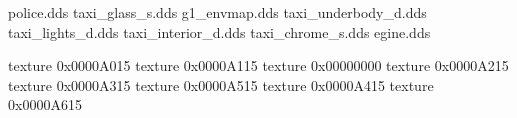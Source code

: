 police.dds
taxi_glass_s.dds
g1_envmap.dds
taxi_underbody_d.dds
taxi_lights_d.dds
taxi_interior_d.dds
taxi_chrome_s.dds
egine.dds


texture 0x0000A015
texture 0x0000A115
texture 0x00000000
texture 0x0000A215
texture 0x0000A315
texture 0x0000A515
texture 0x0000A415
texture 0x0000A615




